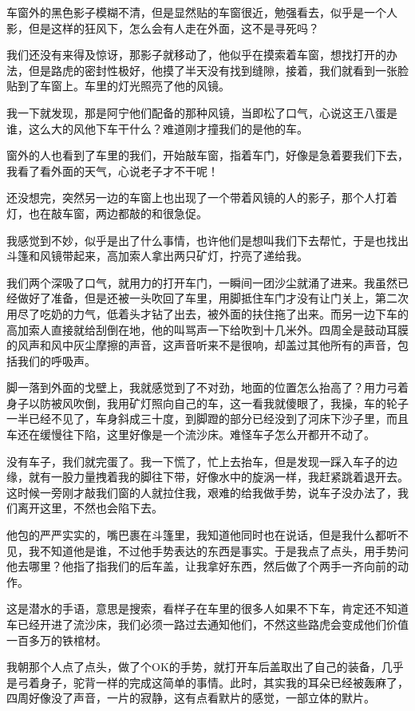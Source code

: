 车窗外的黑色影子模糊不清，但是显然贴的车窗很近，勉强看去，似乎是一个人影，但是这样的狂风下，怎么会有人走在外面，这不是寻死吗？

我们还没有来得及惊讶，那影子就移动了，他似乎在摸索着车窗，想找打开的办法，但是路虎的密封性极好，他摸了半天没有找到缝隙，接着，我们就看到一张脸贴到了车窗上。车里的灯光照亮了他的风镜。

我一下就发现，那是阿宁他们配备的那种风镜，当即松了口气，心说这王八蛋是谁，这么大的风他下车干什么？难道刚才撞我们的是他的车。

窗外的人也看到了车里的我们，开始敲车窗，指着车门，好像是急着要我们下去，我看了看外面的天气，心说老子才不干呢！

还没想完，突然另一边的车窗上也出现了一个带着风镜的人的影子，那个人打着灯，也在敲车窗，两边都敲的和很急促。

我感觉到不妙，似乎是出了什么事情，也许他们是想叫我们下去帮忙，于是也找出斗篷和风镜带起来，高加索人拿出两只矿灯，拧亮了递给我。

我们两个深吸了口气，就用力的打开车门，一瞬间一团沙尘就涌了进来。我虽然已经做好了准备，但是还被一头吹回了车里，用脚抵住车门才没有让门关上，第二次用尽了吃奶的力气，低着头才钻了出去，被外面的扶住拖了出来。而另一边下车的高加索人直接就给刮倒在地，他的叫骂声一下给吹到十几米外。四周全是鼓动耳膜的风声和风中灰尘摩擦的声音，这声音听来不是很响，却盖过其他所有的声音，包括我们的呼吸声。

脚一落到外面的戈壁上，我就感觉到了不对劲，地面的位置怎么抬高了？用力弓着身子以防被风吹倒，我用矿灯照向自己的车，这一看我就傻眼了，我操，车的轮子一半已经不见了，车身斜成三十度，到脚蹬的部分已经没到了河床下沙子里，而且车还在缓慢往下陷，这里好像是一个流沙床。难怪车子怎么开都开不动了。

没有车子，我们就完蛋了。我一下慌了，忙上去抬车，但是发现一踩入车子的边缘，就有一股力量拽着我的脚往下带，好像水中的旋涡一样，我赶紧跳着退开去。这时候一旁刚才敲我们窗的人就拉住我，艰难的给我做手势，说车子没办法了，我们离开这里，不然也会陷下去。

他包的严严实实的，嘴巴裹在斗篷里，我知道他同时也在说话，但是我什么都听不见，我不知道他是谁，不过他手势表达的东西是事实。于是我点了点头，用手势问他去哪里？他指了指我们的后车盖，让我拿好东西，然后做了个两手一齐向前的动作。

这是潜水的手语，意思是搜索，看样子在车里的很多人如果不下车，肯定还不知道车已经开进了流沙床，我们必须一路过去通知他们，不然这些路虎会变成他们价值一百多万的铁棺材。

我朝那个人点了点头，做了个OK的手势，就打开车后盖取出了自己的装备，几乎是弓着身子，驼背一样的完成这简单的事情。此时，其实我的耳朵已经被轰麻了，四周好像没了声音，一片的寂静，这有点看默片的感觉，一部立体的默片。

